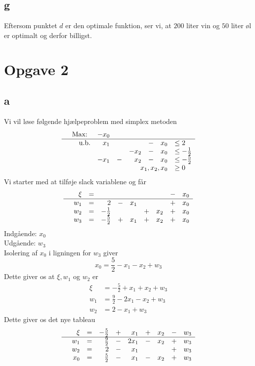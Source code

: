 \documentclass[12pt]{article}
\begin{document}
\subsection*{g}
Eftersom punktet $d$ er den optimale funktion, ser vi, at $200$ liter vin og $50$ liter øl er optimalt og derfor billigst.

\section*{Opgave 2}
\subsection*{a}
Vi vil løse følgende hjælpeproblem med simplex metoden
\begin{equation}
\begin{array}{rrrrrrrl}
&\text{Max: } & -x_0 & & & & & \\
\hline
&\text{u.b.} &x_1 & & &- &x_0 &\leq 2 \\
& & & &-x_2 &- &x_0 &\leq -\frac{1}{2} \\
& &-x_1 &- &x_2 &- &x_0 &\leq -\frac{5}{2} \\
& & & &  \multicolumn{3}{r} {x_1,x_2,x_0} &\geq 0
\end{array}
\end{equation}
Vi starter med at tilføje slack variablene og får
\begin{equation}
\begin{array}{rrrrrrrrrl}
&\xi &= & & & & & & -&x_0 \\
\hline
&w_1 &= &2 &- &x_1 & & &+ &x_0 \\
&w_2 &= &-\frac{1}{2} & & &+ &x_2 &+ &x_0 \\
&w_3 &= &-\frac{5}{2} &+ &x_1 &+ &x_2 &+ &x_0 \\
\end{array}
\end{equation}
Indgående: $x_0$ \\
Udgående: $w_3$ \\
Isolering af $x_0$ i ligningen for $w_3$ giver
$$x_0=\frac{5}{2}-x_1-x_2+w_3$$
Dette giver os at $\xi,w_1$ og $w_2$ er
\begin{align*}
\xi&=-\frac{5}{2}+x_1+x_2+w_3 \\
w_1&=\frac{9}{2}-2x_1-x_2+w_3 \\
w_2&=2-x_1+w_3
\end{align*}
Dette giver os det nye tableau
\begin{equation}
\begin{array}{rrrrrrrrrl}
&\xi &= &-\frac{5}{2}&+&x_1&+&x_2&-&w_3\\
\hline
&w_1 &= &\frac{9}{2} &- &2x_1 &- &x_2 &+ &w_3 \\
&w_2 &= &2 &- &x_1 & & &+ &w_3 \\
&x_0 &= &\frac{5}{2} &- &x_1 &- &x_2 &+ &w_3 \\
\end{array}
\end{equation}
\end{document}
